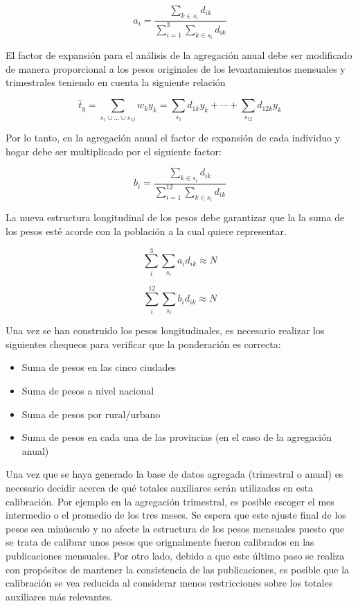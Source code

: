\documentclass[12pt,spanish,]{book}
\providecommand{\tightlist}{%
  \setlength{\itemsep}{0pt}\setlength{\parskip}{0pt}}
\begin{document}
\[
a_i = \frac{\sum_{k\in s_i}d_{ik}}{\sum_{i=1}^{3}\sum_{k\in s_i}d_{ik}}
\]

El factor de expansión para el análisis de la agregación anual debe ser modificado de manera proporcional a los pesos originales de los levantamientos mensuales y trimestrales teniendo en cuenta la siguiente relación

\[
\hat{t}_y = \sum_{s_1 \cup ... \cup s_{12}} w_k y_k
= \sum_{s_1} d_{1k} y_k + \cdots + \sum_{s_{12}} d_{12k} y_k
\]

Por lo tanto, en la agregación anual el factor de expansión de cada individuo y hogar debe ser multiplicado por el siguiente factor:

\[
b_i = \frac{\sum_{k\in s_i}d_{ik}}{\sum_{i=1}^{12}\sum_{k\in s_i}d_{ik}}
\]

La nueva estructura longitudinal de los pesos debe garantizar que la la suma de los pesos esté acorde con la población a la cual quiere representar.

\[
\sum_{i}^{3}\sum_{s_i} a_i d_{ik} \approx N
\]

\[
\sum_{i}^{12}\sum_{s_i} b_i d_{ik} \approx N
\]

Una vez se han construido los pesos longitudinales, es necesario realizar los siguientes chequeos para verificar que la ponderación es correcta:

\begin{itemize}
\tightlist
\item
  Suma de pesos en las cinco ciudades
\item
  Suma de pesos a nivel nacional
\item
  Suma de pesos por rural/urbano
\item
  Suma de pesos en cada una de las provincias (en el caso de la agregación anual)
\end{itemize}

Una vez que se haya generado la base de datos agregada (trimestral o anual) es necesario decidir acerca de qué totales auxiliares serán utilizados en esta calibración. Por ejemplo en la agregación trimestral, es posible escoger el mes intermedio o el promedio de los tres meses. Se espera que este ajuste final de los pesos sea minúsculo y no afecte la estructura de los pesos mensuales puesto que se trata de calibrar unos pesos que orignalmente fueron calibrados en las publicaciones mensuales. Por otro lado, debido a que este último paso se realiza con propósitos de mantener la consistencia de las publicaciones, es posible que la calibración se vea reducida al considerar menos restricciones sobre los totales auxiliares más relevantes.
\end{document}
